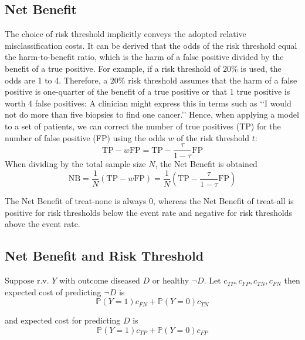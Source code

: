 	
	
\subsection{Net Benefit}
	The choice of risk threshold implicitly conveys the adopted relative misclassification costs. 
	It can be derived that the odds of the risk threshold equal the harm-to-benefit ratio, which is the harm of a false positive divided by the benefit of a true positive.
	For example, if a risk threshold of $20\%$ is used, the odds are 1 to 4. 
	Therefore, a $20\%$ risk threshold assumes that the harm of a false positive is one-quarter of the benefit of a true positive or that 1 true positive is worth 4 false positives: 
	A clinician might express this in terms such as ‘‘I would not do more than five biopsies to find one cancer.’’ 
	Hence, when applying a model to a set of patients,
	we can correct the number of true positives (TP) for the number of false positive (FP) using the odds $w$ of the risk threshold $t$: 
	\[
		\text{TP} - w \text{FP} = \text{TP} - \frac{\tau}{1-\tau} \text{FP}
	\]
	When dividing by the total sample size $N$, the Net Benefit is obtained
	\[
		\text{NB} = \frac{1}{N} (\text{TP} - w \text{FP}) = \frac{1}{N} (\text{TP} - \frac{\tau}{1-\tau} \text{FP})
	\]
	
	The Net Benefit of treat-none is always 0, 
	whereas the Net Benefit of treat-all is positive for risk thresholds below the event rate and negative for risk thresholds above the event rate.
	
	
\subsection{Net Benefit and Risk Threshold}
	Suppose r.v. $Y$ with outcome diseased $D$ or healthy $\neg D$.
	Let $c_{TP}, c_{FP}, c_{TN}, c_{FN}$ then expected cost of predicting $\neg D$ is
	\[
		\mathbb{P}(Y = 1) c_{FN} + \mathbb{P}(Y = 0) c_{TN}
	\]
	
	and expected cost for predicting $D$ is
	\[
		\mathbb{P}(Y = 1) c_{TP} + \mathbb{P}(Y = 0) c_{FP}
	\]
	
